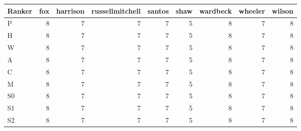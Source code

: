 \begin{tabular}{lrrrrrrrr}
\toprule
Ranker & fox & harrison & russellmitchell & santos & shaw & wardbeck & wheeler & wilson \\
\midrule
P & 8 & 7 & 7 & 7 & 5 & 8 & 7 & 8 \\
H & 8 & 7 & 7 & 7 & 5 & 8 & 7 & 8 \\
W & 8 & 7 & 7 & 7 & 5 & 8 & 7 & 8 \\
A & 8 & 7 & 7 & 7 & 5 & 8 & 7 & 8 \\
C & 8 & 7 & 7 & 7 & 5 & 8 & 7 & 8 \\
M & 8 & 7 & 7 & 7 & 5 & 8 & 7 & 8 \\
S0 & 8 & 7 & 7 & 7 & 5 & 8 & 7 & 8 \\
S1 & 8 & 7 & 7 & 7 & 5 & 8 & 7 & 8 \\
S2 & 8 & 7 & 7 & 7 & 5 & 8 & 7 & 8 \\
\bottomrule
\end{tabular}
